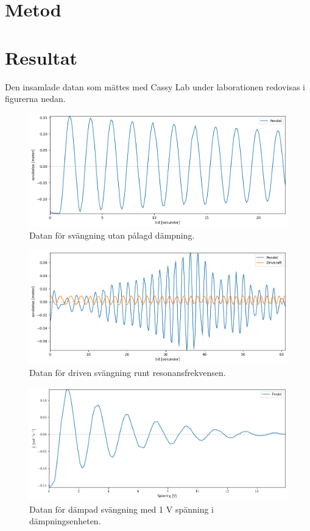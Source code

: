 \documentclass[12pt, a4paper]{article}
\begin{document}
\section{Metod}

\section{Resultat}
Den insamlade datan som mättes med Cassy Lab under laborationen redovisas i figurerna nedan. 

\begin{figure}[hp]
    \includegraphics[width=\textwidth]{graf_egenfrekvens}
    \caption{Datan för svängning utan pålagd dämpning.}
    \label{fig:data_egenfrekvens}
\end{figure}

\begin{figure}[hp]
    \includegraphics[width=\textwidth]{graf_resonansfrekvens}
    \caption{Datan för driven svängning runt resonansfrekvensen.}
    \label{fig:data_resonansfrekvens}
\end{figure}

\begin{figure}[hp]
    \includegraphics[width=\textwidth]{graf_1_v_centered}
    \caption{Datan för dämpad svängning med 1 V spänning i dämpningsenheten.}
    \label{fig:data_1_v}
\end{figure}
\end{document}
